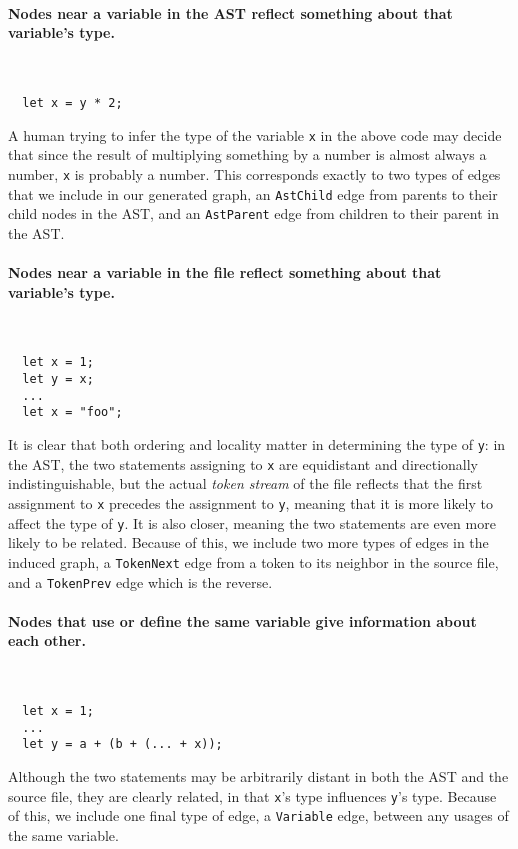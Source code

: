 \paragraph{Nodes near a variable in the AST reflect something about that variable's type.}\
\ %
\begin{lstlisting}
  let x = y * 2;
\end{lstlisting}
A human trying to infer the type of the variable \texttt{x} in the above code may decide that since the result of multiplying something by a number is almost always a number, \texttt{x} is probably a number.
This corresponds exactly to two types of edges that we include in our generated graph, an \texttt{AstChild} edge from parents to their child nodes in the AST, and an \texttt{AstParent} edge from children to their parent in the AST.

\par\paragraph{Nodes near a variable in the file reflect something about that variable's type.}
\ %
\begin{lstlisting}
  let x = 1;
  let y = x;
  ...
  let x = "foo";
\end{lstlisting}
It is clear that both ordering and locality matter in determining the type of \texttt{y}: in the AST, the two statements assigning to \texttt{x} are equidistant and directionally indistinguishable, but the actual \emph{token stream} of the file reflects that the first assignment to \texttt{x} precedes the assignment to \texttt{y}, meaning that it is more likely to affect the type of \texttt{y}.
It is also closer, meaning the two statements are even more likely to be related.
Because of this, we include two more types of edges in the induced graph, a \texttt{TokenNext} edge from a token to its neighbor in the source file, and a \texttt{TokenPrev} edge which is the reverse.

\paragraph{Nodes that use or define the same variable give information about each other.}
\ %
\begin{lstlisting}
  let x = 1;
  ...
  let y = a + (b + (... + x));
\end{lstlisting}
Although the two statements may be arbitrarily distant in both the AST and the source file, they are clearly related, in that \texttt{x}'s type influences \texttt{y}'s type.
Because of this, we include one final type of edge, a \texttt{Variable} edge, between any usages of the same variable.

